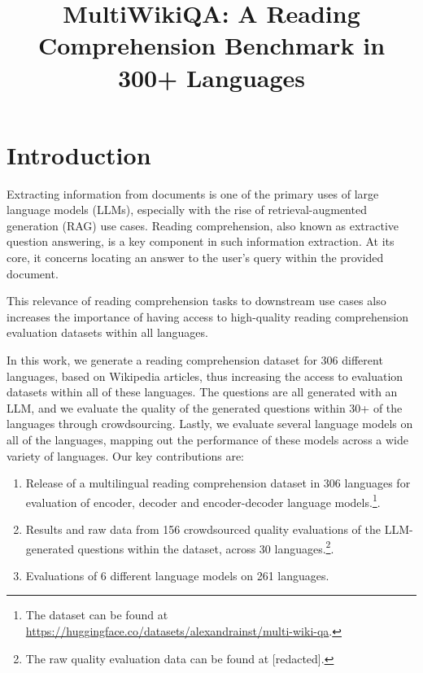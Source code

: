 \documentclass[10pt, a4paper]{article}
\title{MultiWikiQA: A Reading Comprehension Benchmark in 300+ Languages}
\begin{document}
\maketitleabstract

\section{Introduction}
Extracting information from documents is one of the primary uses of large language
models (LLMs), especially with the rise of retrieval-augmented generation (RAG) use
cases. Reading comprehension, also known as extractive question answering, is a key
component in such information extraction. At its core, it concerns locating an answer to
the user's query within the provided document.

This relevance of reading comprehension tasks to downstream use cases also increases the
importance of having access to high-quality reading comprehension evaluation datasets
within all languages.

In this work, we generate a reading comprehension dataset for 306 different languages,
based on Wikipedia articles, thus increasing the access to evaluation datasets within
all of these languages. The questions are all generated with an LLM, and we evaluate the
quality of the generated questions within 30+ of the languages through crowdsourcing.
Lastly, we evaluate several language models on all of the languages, mapping out the
performance of these models across a wide variety of languages. Our key contributions
are:

\begin{enumerate}
    \item Release of a multilingual reading comprehension dataset in 306 languages for
      evaluation of  encoder, decoder and encoder-decoder language models.\footnote{The
      dataset can be found at
    \url{https://huggingface.co/datasets/alexandrainst/multi-wiki-qa}.}.
    \item Results and raw data from 156 crowdsourced quality evaluations of the
      LLM-generated questions within the dataset, across 30 languages.\footnote{The raw
      quality evaluation data can be found at [redacted].}.
    \item Evaluations of 6 different language models on 261 languages.
\end{enumerate}
\end{document}
